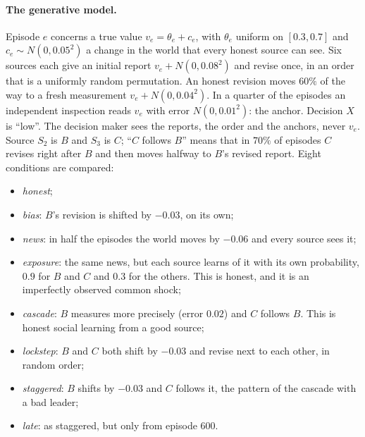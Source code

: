 \documentclass[11pt]{article}
\theoremstyle{definition}\newtheorem{definition}[theorem]{Definition}\newtheorem{remark}[theorem]{Remark}\newtheorem{example}[theorem]{Example}\newtheorem{problem}[theorem]{Open problem}\crefname{problem}{Problem}{Problems}
\begin{document}
\paragraph{The generative model.} Episode $e$ concerns a true value $v_e=\theta_e+c_e$, with $\theta_e$ uniform on $[0.3,0.7]$ and $c_e\sim N(0,0.05^2)$ a change in the world that every honest source can see. Six sources each give an initial report $v_e+N(0,0.08^2)$ and revise once, in an order that is a uniformly random permutation. An honest revision moves $60\%$ of the way to a fresh measurement $v_e+N(0,0.04^2)$. In a quarter of the episodes an independent inspection reads $v_e$ with error $N(0,0.01^2)$: the anchor. Decision $X$ is ``low''. The decision maker sees the reports, the order and the anchors, never $v_e$. Source $S_2$ is $B$ and $S_3$ is $C$; ``$C$ follows $B$'' means that in $70\%$ of episodes $C$ revises right after $B$ and then moves halfway to $B$'s revised report. Eight conditions are compared:
\begin{itemize}
\item \emph{honest};
\item \emph{bias}: $B$'s revision is shifted by $-0.03$, on its own;
\item \emph{news}: in half the episodes the world moves by $-0.06$ and every source sees it;
\item \emph{exposure}: the same news, but each source learns of it with its own probability, $0.9$ for $B$ and $C$ and $0.3$ for the others. This is honest, and it is an imperfectly observed common shock;
\item \emph{cascade}: $B$ measures more precisely (error $0.02$) and $C$ follows $B$. This is honest social learning from a good source;
\item \emph{lockstep}: $B$ and $C$ both shift by $-0.03$ and revise next to each other, in random order;
\item \emph{staggered}: $B$ shifts by $-0.03$ and $C$ follows it, the pattern of the cascade with a bad leader;
\item \emph{late}: as staggered, but only from episode $600$.
\end{itemize}
\end{document}
